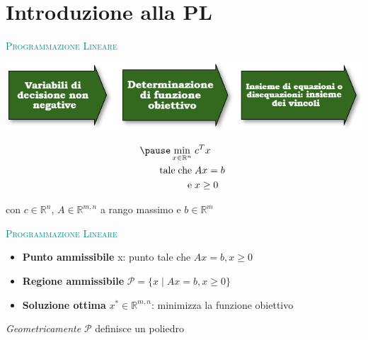 \begin{frame}[t,plain]
\titlepage
\end{frame}

\begin{frame}
	\frametitle{}
	\hypersetup{linkcolor=black}
	\tableofcontents
\end{frame}




\section{Introduzione alla PL}
\begin{frame}{\textsc{\LARGE \textcolor{darkcyan}{Programmazione Lineare}}}
	\pause
	\begin{center}
	\includegraphics[width = 9 cm]{fasi.png}
	\end{center}
\pause
\begin{equation*}
\begin{split}
\pause \min\limits_{x\in\mathbb{R}^{n}}\;&c^{T}x\\
\text{tale\;che\;}&Ax= b\;\\\text{e\;}&x\geq0
\end{split}
\end{equation*}
\begin{center}
con $c\in\mathbb{R}^{n}$, $A\in\mathbb{R}^{m,n}$ a rango massimo e $b\in\mathbb{R}^{m}$
\end{center}	
\end{frame}


\begin{frame}{\textsc{\LARGE \textcolor{darkcyan}{Programmazione Lineare}}}
	\pause
	\begin{itemize}
		\item \textbf{Punto ammissibile} x: punto tale che $Ax = b, x\geq 0$
		\item \textbf{Regione ammissibile} $\mathcal{P}=\{x\;|\; Ax = b, x\geq 0\}$
		\item \textbf{Soluzione ottima} $x^{*}\in\mathbb{R}^{m,n}$: minimizza la funzione obiettivo
	\end{itemize}
\pause
\centering\emph{Geometricamente} $\mathcal{P}$ definisce un poliedro
\end{frame}

